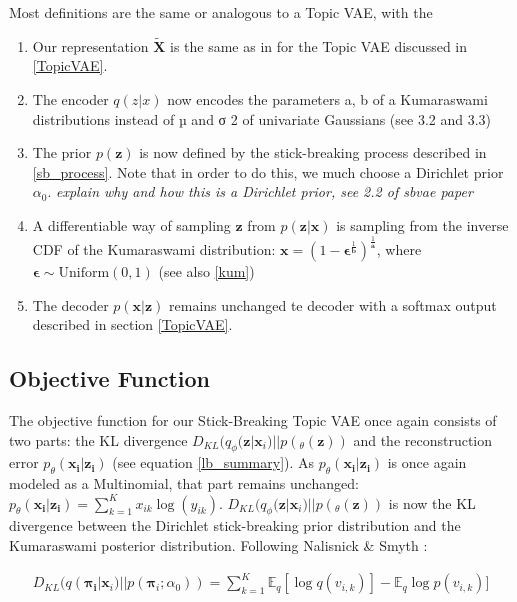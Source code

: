 \documentclass{report}
\begin{document}
Most definitions are the same or analogous to a Topic VAE, with the

\begin{enumerate}
	\item Our representation  $\tilde{\mathbf{X}} $ is the same as in for the Topic VAE discussed in \ref{TopicVAE}.
	\item The encoder $q(z|x)$ now encodes the parameters {a, b} of a Kumaraswami distributions
	instead of µ and σ
	2 of univariate Gaussians (see 3.2 and 3.3)
	\item The prior $p(\mathbf{z})$ is now defined by the stick-breaking process described in \ref{sb_process}. Note that in order to do this, we much choose a Dirichlet prior $\alpha_0$. \textit{explain why and how this is a Dirichlet prior, see 2.2 of sbvae paper}
	\item A differentiable way of sampling $\mathbf{z}$ from $p(\mathbf{z}|\mathbf{x})$ is sampling from the inverse CDF of the Kumaraswami distribution: $\mathbf{x} = (1-\boldsymbol{\epsilon}^{\frac{1}{\mathbf{b}}})^{\frac{1}{\mathbf{a}}}$, where $\boldsymbol{\epsilon} \sim \text{Uniform}(0,1)$ (see also \ref{kum})
	\item The decoder $p(\mathbf{x}|\mathbf{z})$ remains unchanged te decoder with a softmax output described in section \ref{TopicVAE}.
\end{enumerate}

\subsection{Objective Function}
The objective function for our Stick-Breaking Topic VAE once again consists of two parts: the KL divergence $D_{KL}(q_\phi (\mathbf{z}|\mathbf{x}_i)||p(_\theta(\mathbf{z}))$ and the reconstruction error $ p_\theta(\mathbf{x_i}|\mathbf{z_i})$ (see equation \ref{lb_summary}). As $ p_\theta(\mathbf{x_i}|\mathbf{z_i})$ is once again modeled as a Multinomial, that part remains unchanged:
$p_\theta(\mathbf{x_i}|\mathbf{z_i}) = \sum_{k=1}^K x_{ik} \log (y_{ik})$. $D_{KL}(q_\phi (\mathbf{z}|\mathbf{x}_i)||p(_\theta(\mathbf{z}))$ is now the KL divergence between the Dirichlet stick-breaking prior distribution and the Kumaraswami posterior distribution. Following Nalisnick \& Smyth \cite{nalisnick2016deep}:

\begin{align}\label{KLSB}
D_{KL}(q(\mathbf{\mathbf{\pi}_i}|\mathbf{x}_i)||p(\mathbf{\pi}_i;\alpha_0)) = \sum_{k=1}^{K}\mathbb{E}_q [\log q(v_{i,k})] - \mathbb{E}_q \log p(v_{i,k})]
\end{align}
\end{document}
